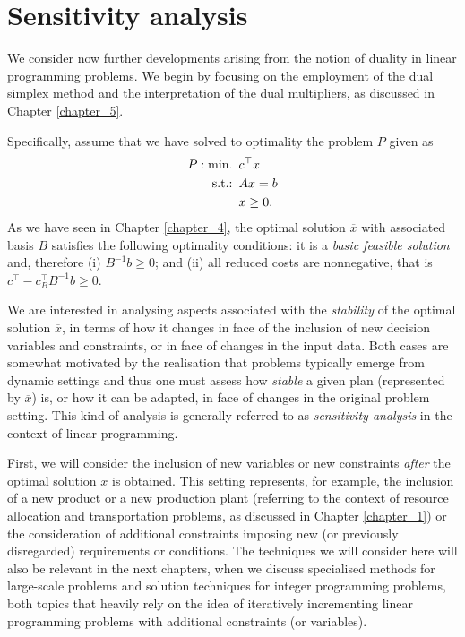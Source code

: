 \section{Sensitivity analysis}

We consider now further developments arising from the notion of duality in linear programming problems. We begin by focusing on the employment of the dual simplex method and the interpretation of the dual multipliers, as discussed in Chapter \ref{chapter_5}. 

Specifically, assume that we have solved to optimality the problem $P$ given as
%
\begin{align*}
	P : \mathop{\text{min.~}} \, &c^\top x \\
	\mathop{\text{s.t.:~}} \, & Ax = b \\
	& x \geq 0. 	
\end{align*}
%
As we have seen in Chapter \ref{chapter_4}, the optimal solution $\overline{x}$ with associated basis $B$ satisfies the following optimality conditions: it is a \emph{basic feasible solution} and, therefore (i) $B^{-1}b \geq 0$; and (ii) all reduced costs are nonnegative, that is $c^\top - c_B^\top B^{-1}b \geq 0$.

We are interested in analysing aspects associated with the \emph{stability} of the optimal solution $\overline{x}$, in terms of how it changes in face of the inclusion of new decision variables and constraints, or in face of changes in the input data. Both cases are somewhat motivated by the realisation that problems typically emerge from dynamic settings and thus one must assess how \emph{stable} a given plan (represented by $\overline{x}$) is, or how it can be adapted, in face of changes in the original problem setting. This kind of analysis is generally referred to as \emph{sensitivity analysis} in the context of linear programming.

First, we will consider the inclusion of new variables or new constraints \emph{after} the optimal solution $\overline{x}$ is obtained. This setting represents, for example, the inclusion of a new product or a new production plant (referring to the context of resource allocation and transportation problems, as discussed in Chapter \ref{chapter_1}) or the consideration of additional constraints imposing new (or previously disregarded) requirements or conditions. The techniques we will consider here will also be relevant in the next chapters, when we discuss specialised methods for large-scale problems and solution techniques for integer programming problems, both topics that heavily rely on the idea of iteratively incrementing linear programming problems with additional constraints (or variables).

